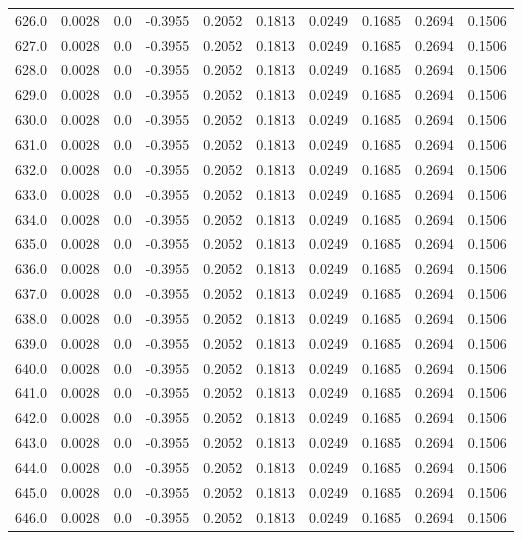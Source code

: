 \begin{longtable}{lrrrrrrrrr}
626.0 & 0.0028 & 0.0 & -0.3955 & 0.2052 & 0.1813 & 0.0249 & 0.1685 & 0.2694 & 0.1506 \\
627.0 & 0.0028 & 0.0 & -0.3955 & 0.2052 & 0.1813 & 0.0249 & 0.1685 & 0.2694 & 0.1506 \\
628.0 & 0.0028 & 0.0 & -0.3955 & 0.2052 & 0.1813 & 0.0249 & 0.1685 & 0.2694 & 0.1506 \\
629.0 & 0.0028 & 0.0 & -0.3955 & 0.2052 & 0.1813 & 0.0249 & 0.1685 & 0.2694 & 0.1506 \\
630.0 & 0.0028 & 0.0 & -0.3955 & 0.2052 & 0.1813 & 0.0249 & 0.1685 & 0.2694 & 0.1506 \\
631.0 & 0.0028 & 0.0 & -0.3955 & 0.2052 & 0.1813 & 0.0249 & 0.1685 & 0.2694 & 0.1506 \\
632.0 & 0.0028 & 0.0 & -0.3955 & 0.2052 & 0.1813 & 0.0249 & 0.1685 & 0.2694 & 0.1506 \\
633.0 & 0.0028 & 0.0 & -0.3955 & 0.2052 & 0.1813 & 0.0249 & 0.1685 & 0.2694 & 0.1506 \\
634.0 & 0.0028 & 0.0 & -0.3955 & 0.2052 & 0.1813 & 0.0249 & 0.1685 & 0.2694 & 0.1506 \\
635.0 & 0.0028 & 0.0 & -0.3955 & 0.2052 & 0.1813 & 0.0249 & 0.1685 & 0.2694 & 0.1506 \\
636.0 & 0.0028 & 0.0 & -0.3955 & 0.2052 & 0.1813 & 0.0249 & 0.1685 & 0.2694 & 0.1506 \\
637.0 & 0.0028 & 0.0 & -0.3955 & 0.2052 & 0.1813 & 0.0249 & 0.1685 & 0.2694 & 0.1506 \\
638.0 & 0.0028 & 0.0 & -0.3955 & 0.2052 & 0.1813 & 0.0249 & 0.1685 & 0.2694 & 0.1506 \\
639.0 & 0.0028 & 0.0 & -0.3955 & 0.2052 & 0.1813 & 0.0249 & 0.1685 & 0.2694 & 0.1506 \\
640.0 & 0.0028 & 0.0 & -0.3955 & 0.2052 & 0.1813 & 0.0249 & 0.1685 & 0.2694 & 0.1506 \\
641.0 & 0.0028 & 0.0 & -0.3955 & 0.2052 & 0.1813 & 0.0249 & 0.1685 & 0.2694 & 0.1506 \\
642.0 & 0.0028 & 0.0 & -0.3955 & 0.2052 & 0.1813 & 0.0249 & 0.1685 & 0.2694 & 0.1506 \\
643.0 & 0.0028 & 0.0 & -0.3955 & 0.2052 & 0.1813 & 0.0249 & 0.1685 & 0.2694 & 0.1506 \\
644.0 & 0.0028 & 0.0 & -0.3955 & 0.2052 & 0.1813 & 0.0249 & 0.1685 & 0.2694 & 0.1506 \\
645.0 & 0.0028 & 0.0 & -0.3955 & 0.2052 & 0.1813 & 0.0249 & 0.1685 & 0.2694 & 0.1506 \\
646.0 & 0.0028 & 0.0 & -0.3955 & 0.2052 & 0.1813 & 0.0249 & 0.1685 & 0.2694 & 0.1506 \\

\end{longtable}
